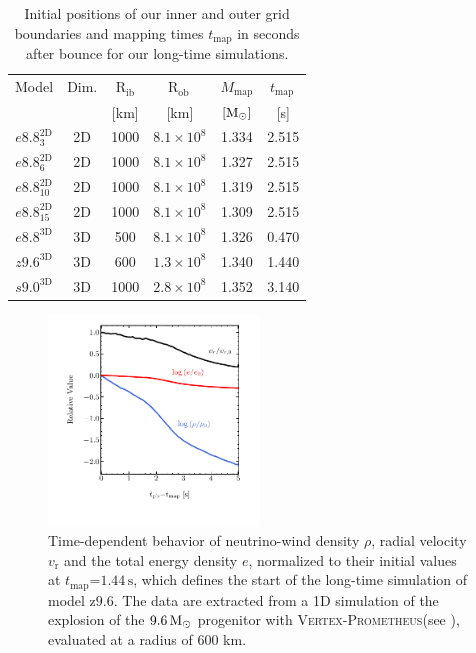 \documentclass[fleqn,usenatbib]{mnras}
\newcommand{\solm}{\ensuremath{\rm{M_{\odot}}}\xspace}
\newcommand{\s}{\ensuremath{\text{s}}}
\newcommand{\vertexprom}{\textsc{Vertex-Prometheus}\xspace}
\newcommand{\znine}{\ensuremath{\mathrm{z9.6}}\xspace}
\begin{document}
\begin{table} %
 \centering
 \caption{Initial positions of our inner and outer grid boundaries 
 and mapping times $t_\mathrm{map}$ in seconds 
 after bounce for our long-time simulations. }
\label{tab:long term boundaries}
\begin{tabular}{cccccc}
  \hline
 Model & Dim. & $\mathrm{R_{ib}}$ & $\mathrm{R_{ob}\,}$ & $M_{\mathrm{map}}$ &  $t_{\mathrm{map}}\,$   \\
       & & [km] & [km] & $[\solm]$ & [s]  \\
  \hline
 $e8.8^{\mathrm{2D}}_{3}$  & 2D & 1000 & $8.1\times10^{8}$ & 1.334 & 2.515 \\
 $e8.8^{\mathrm{2D}}_{6}$  & 2D & 1000 & $8.1\times10^{8}$ & 1.327 & 2.515 \\
 $e8.8^{\mathrm{2D}}_{10}$ & 2D & 1000 & $8.1\times10^{8}$ & 1.319 & 2.515 \\
 $e8.8^{\mathrm{2D}}_{15}$ & 2D & 1000 & $8.1\times10^{8}$ & 1.309 & 2.515 \\
 $e8.8^{\mathrm{3D}}$      & 3D & 500  & $8.1\times10^{8}$ & 1.326 & 0.470 \\
 $z9.6^{\mathrm{3D}}$      & 3D & 600  & $1.3\times10^{8}$ & 1.340 & 1.440 \\
 $s9.0^{\mathrm{3D}}$      & 3D & 1000  & $2.8\times10^{8}$ & 1.352 & 3.140 \\
  \hline
\end{tabular}
\end{table} %
\begin{figure} %
\label{fig:wind}
 \centering
 \includegraphics[width=0.50\textwidth,trim=0.2cm 1.1cm 0.2cm 0.2cm,clip]{./pic/wind_paper.pdf}
 \caption{Time-dependent behavior of neutrino-wind density $\rho$, radial velocity $v_{\mathrm{r}}$ 
 and the total energy density $e$, normalized to their initial values at 
 $t_{\mathrm{map}}\mathord{=}1.44\,\s$, which defines the start of the long-time simulation 
 of model \znine. The data are extracted from a 1D simulation of the explosion of the 
 $9.6\,\solm$ progenitor with \vertexprom (see \citealt{Mirizzi2016}), evaluated at a radius of 600 km. }
\end{figure}%
\end{document}
